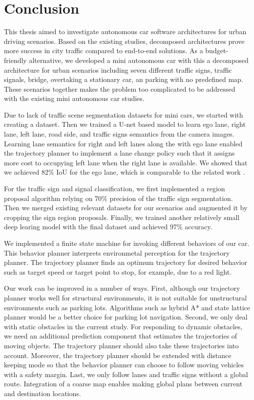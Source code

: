 \chapter{Conclusion}
\label{chp:b7}

This thesis aimed to investigate autonomous car software architectures for
urban driving scenarios. Based on the existing studies, decomposed
architectures prove more success in city traffic compared to end-to-end
solutions. As a budget-friendly alternative, we developed a mini autonomous car
with this a decomposed architecture for urban scenarios including seven
different traffic signs, traffic signals, bridge, overtaking a stationary car,
an parking with no predefined map. These scenarios together makes the problem
too complicated to be addressed with the existing mini autonomous car studies.

Due to lack of traffic scene segmentation datasets for mini cars, we started
with creating a dataset. Then we trained a U-net based model to learn ego lane,
right lane, left lane, road side, and traffic signs semantics from the camera
images. Learning lane semantics for right and left lanes along the with ego
lane enabled the trajectory planner to implement a lane change policy such that
it assigns more cost to occupying left lane when the right lane is available.
We showed that we achieved 82\% IoU for the ego lane, which is comparable to
the related work \cite{Meyer2018DeepSL}.

For the traffic sign and signal classification, we first implemented a region
proposal algorithm relying on 70\% precision of the traffic sign segmentation.
Then we merged existing relevant datasets for our scenarios and augmented it by
cropping the sign region proposals. Finally, we trained another relatively
small deep learing model with the final dataset and achieved 97\% accuracy.

We implemented a finite state machine for invoking different behaviors of our
car. This behavior planner interprets environmetal perception for the
trajectory planner. The trajectory planner finds an optimum trajectory for
desired behavior such as target speed or target point to stop, for example, due
to a red light.

Our work can be improved in a number of ways. First, although our trajectory
planner works well for structural environments, it is not suitable for
unstructural environments such as parking lots. Algorithms such as hybrid A*
and state lattice planner would be a better choice for parking lot navigation.
Second, we only deal with static obstacles in the current study. For responding
to dynamic obstacles, we need an additional prediction component that estimates
the trajectories of moving objects. The trajectory planner should also take
these trajectories into account. Moreover, the trajectory planner should be
extended with distance keeping mode so that the behavior planner can choose to
follow moving vehicles with a safety margin. Last, we only follow lanes and
traffic signs without a global route. Integration of a coarse map enables
making global plans between current and destination locations.

